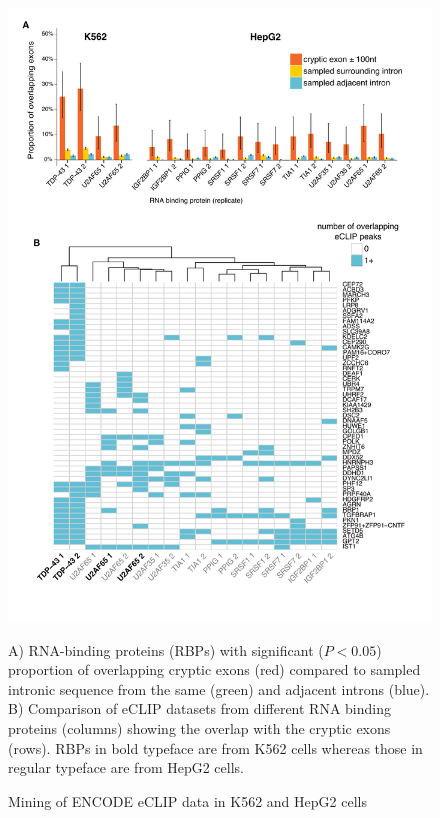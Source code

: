 \begin{figure}[h!]
	  \begin{center}
		\includegraphics[width=14cm]{Figures/03_cryptic_exons/Figure_7_ENCODE_mining.png}
	\end{center}
	\caption{Mining of ENCODE eCLIP data in K562 and HepG2 cells}
		A) RNA-binding proteins (RBPs) with significant ($P < 0.05$) proportion of overlapping cryptic exons (red) compared to sampled intronic sequence from the same (green) and adjacent introns (blue). B) Comparison of eCLIP datasets from different RNA binding proteins (columns) showing the overlap with the cryptic exons (rows). RBPs in bold typeface are from K562 cells whereas those in regular typeface are from HepG2 cells.
\end{figure}

